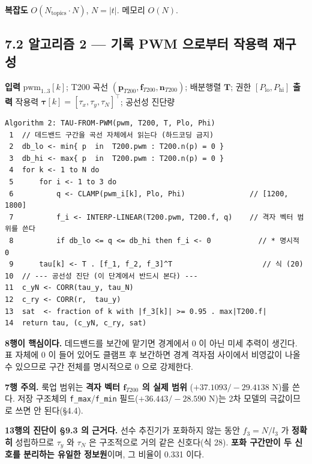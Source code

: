 \documentclass[10pt,a4paper]{article}
\begin{document}
\textbf{복잡도} $O(N_{\text{topics}} \cdot N)$, $N = |t|$. 메모리 $O(N)$.

\subsection*{7.2 알고리즘 2 --- 기록 PWM 으로부터 작용력 재구성}

\textbf{입력} $\mathrm{pwm}_{1..3}[k]$; T200 곡선 $(\mathbf{p}_{T200}, \mathbf{f}_{T200}, \mathbf{n}_{T200})$; 배분행렬 $\mathbf{T}$; 권한 $[P_{\text{lo}}, P_{\text{hi}}]$ \textbf{출력} 작용력 $\boldsymbol{\tau}[k] = [\tau_x, \tau_y, \tau_N]^\top$; 공선성 진단량

\begin{Verbatim}[fontsize=\small,frame=single,framesep=2.2mm,rulecolor=\color{black!35}]
Algorithm 2: TAU-FROM-PWM(pwm, T200, T, Plo, Phi)
 1  // 데드밴드 구간을 곡선 자체에서 읽는다 (하드코딩 금지)
 2  db_lo <- min{ p  in  T200.pwm : T200.n(p) = 0 }
 3  db_hi <- max{ p  in  T200.pwm : T200.n(p) = 0 }
 4  for k <- 1 to N do
 5      for i <- 1 to 3 do
 6          q <- CLAMP(pwm_i[k], Plo, Phi)               // [1200, 1800]
 7          f_i <- INTERP-LINEAR(T200.pwm, T200.f, q)    // 격자 벡터 범위를 쓴다
 8          if db_lo <= q <= db_hi then f_i <- 0           // * 명시적 0
 9      tau[k] <- T . [f_1, f_2, f_3]^T                     // 식 (20)
10  // --- 공선성 진단 (이 단계에서 반드시 본다) ---
11  c_yN <- CORR(tau_y, tau_N)
12  c_ry <- CORR(r,  tau_y)
13  sat  <- fraction of k with |f_3[k]| >= 0.95 . max|T200.f|
14  return tau, (c_yN, c_ry, sat)
\end{Verbatim}

\textbf{8행이 핵심이다.} 데드밴드를 보간에 맡기면 경계에서 0 이 아닌 미세 추력이 생긴다. 표 자체에 0 이 들어 있어도 클램프 후 보간하면 경계 격자점 사이에서 비영값이 나올 수 있으므로 구간 전체를 명시적으로 0 으로 강제한다.

\textbf{7행 주의.} 룩업 범위는 \textbf{격자 벡터 $\mathbf{f}_{T200}$ 의 실제 범위} ($+37.1093/-29.4138$ N)를 쓴다. 저장 구조체의 \texttt{f\_max}/\texttt{f\_min} 필드($+36.443/-28.590$ N)는 2차 모델의 극값이므로 쓰면 안 된다(\S{}4.4).

\textbf{13행의 진단이 \S{}9.3 의 근거다.} 선수 추진기가 포화하지 않는 동안 $f_3 = N/l_3$ 가 \textbf{정확히} 성립하므로 $\tau_y$ 와 $\tau_N$ 은 구조적으로 거의 같은 신호다(식 28). \textbf{포화 구간만이 두 신호를 분리하는 유일한 정보원}이며, 그 비율이 0.331 이다.
\end{document}
